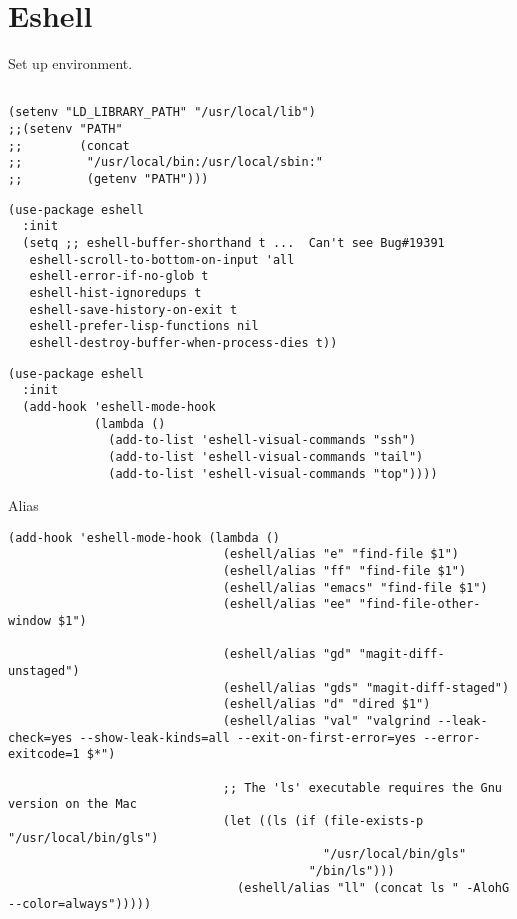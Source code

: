 \documentclass[12pt]{article}
\begin{document}
\section{Eshell}
\label{sec:orga30a97f}

Set up environment.
\begin{verbatim}

(setenv "LD_LIBRARY_PATH" "/usr/local/lib")
;;(setenv "PATH"
;;        (concat
;;         "/usr/local/bin:/usr/local/sbin:"
;;         (getenv "PATH")))

\end{verbatim}

\begin{verbatim}
(use-package eshell
  :init
  (setq ;; eshell-buffer-shorthand t ...  Can't see Bug#19391
   eshell-scroll-to-bottom-on-input 'all
   eshell-error-if-no-glob t
   eshell-hist-ignoredups t
   eshell-save-history-on-exit t
   eshell-prefer-lisp-functions nil
   eshell-destroy-buffer-when-process-dies t))
\end{verbatim}

\begin{verbatim}
(use-package eshell
  :init
  (add-hook 'eshell-mode-hook
            (lambda ()
              (add-to-list 'eshell-visual-commands "ssh")
              (add-to-list 'eshell-visual-commands "tail")
              (add-to-list 'eshell-visual-commands "top"))))
\end{verbatim}

Alias
\begin{verbatim}
(add-hook 'eshell-mode-hook (lambda ()
                              (eshell/alias "e" "find-file $1")
                              (eshell/alias "ff" "find-file $1")
                              (eshell/alias "emacs" "find-file $1")
                              (eshell/alias "ee" "find-file-other-window $1")

                              (eshell/alias "gd" "magit-diff-unstaged")
                              (eshell/alias "gds" "magit-diff-staged")
                              (eshell/alias "d" "dired $1")
                              (eshell/alias "val" "valgrind --leak-check=yes --show-leak-kinds=all --exit-on-first-error=yes --error-exitcode=1 $*")

                              ;; The 'ls' executable requires the Gnu version on the Mac
                              (let ((ls (if (file-exists-p "/usr/local/bin/gls")
                                            "/usr/local/bin/gls"
                                          "/bin/ls")))
                                (eshell/alias "ll" (concat ls " -AlohG --color=always")))))
\end{verbatim}
\end{document}

